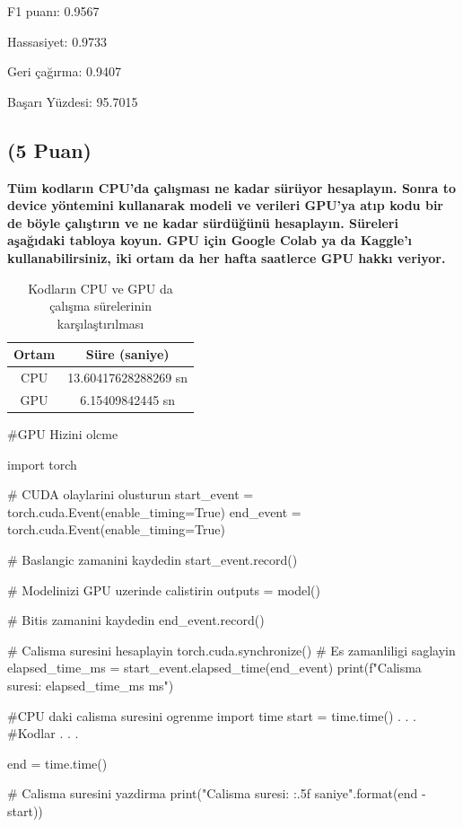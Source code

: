 \documentclass[11pt]{article}
\begin{document}
F1 puanı: 0.9567

Hassasiyet: 0.9733

Geri çağırma: 0.9407

Başarı Yüzdesi: 95.7015

\subsection{(5 Puan)} \textbf{Tüm kodların CPU'da çalışması ne kadar sürüyor hesaplayın. Sonra to device yöntemini kullanarak modeli ve verileri GPU'ya atıp kodu bir de böyle çalıştırın ve ne kadar sürdüğünü hesaplayın. Süreleri aşağıdaki tabloya koyun. GPU için Google Colab ya da Kaggle'ı kullanabilirsiniz, iki ortam da her hafta saatlerce GPU hakkı veriyor.}

\begin{table}[ht!]
    \centering
    \caption{Kodların CPU ve GPU da çalışma sürelerinin karşılaştırılması}
    \begin{tabular}{c|c}
        Ortam & Süre (saniye) \\\hline
        CPU & 13.60417628288269 sn \\
        GPU & 6.15409842445 sn \\
    \end{tabular}
    \label{tab:my_table}

\end{table}



\begin{python}
#GPU Hizini olcme

import torch

# CUDA olaylarini olusturun
start_event = torch.cuda.Event(enable_timing=True)
end_event = torch.cuda.Event(enable_timing=True)

# Baslangic zamanini kaydedin
start_event.record()

# Modelinizi GPU uzerinde calistirin
outputs = model()

# Bitis zamanini kaydedin
end_event.record()


# Calisma suresini hesaplayin
torch.cuda.synchronize() # Es zamanliligi saglayin
elapsed_time_ms = start_event.elapsed_time(end_event)
print(f"Calisma suresi: {elapsed_time_ms} ms")

#CPU daki calisma suresini ogrenme
import time
start = time.time()
.
.
.
    #Kodlar
.
.
.

end = time.time()

# Calisma suresini yazdirma
print("Calisma suresi: {:.5f} saniye".format(end - start))


\end{python}
\end{document}
